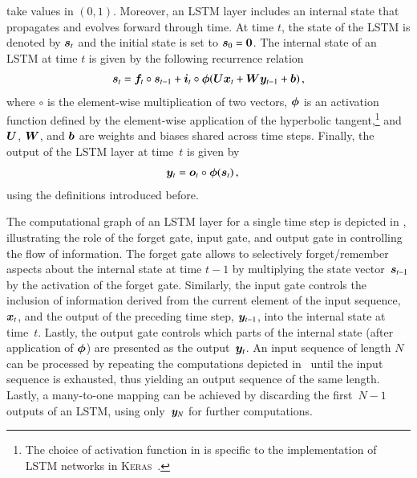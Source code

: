 take values in $(0, 1)$. Moreover, an LSTM layer includes an internal state that
propagates and evolves forward through time. At time $t$, the state of the LSTM
is denoted by $\bm{s}_{t}$ and the initial state is set to
$\bm{s}_{0} = \bm{0}$. The internal state of an LSTM at time $t$ is given
by the following recurrence relation~\cite{Goodfellow-et-al-2016,keras}
\begin{align}
  \bm{s}_{t} = \bm{f}_{t} \circ \bm{s}_{t - 1}
  + \bm{i}_{t} \circ \bm{\phi}(\bm{U} \bm{x}_{t} + \bm{W} \bm{y}_{t-1} + \bm{b}) \,\text{,}
  \label{eq:lstm_state_update}
\end{align}
where $\circ$ is the element-wise multiplication of two vectors, $\bm{\phi}$
is an activation function defined by the element-wise application of the
hyperbolic tangent,\footnote{The choice of activation function in
   is specific to the implementation of LSTM networks
  in \textsc{Keras}~\cite{keras}.} and $\bm{U}$, $\bm{W}$, and $\bm{b}$
are weights and biases shared across time steps. Finally, the output of the LSTM
layer at time~$t$ is given by~\cite{Goodfellow-et-al-2016}
\begin{align}
  &\bm{y}_{t} = \bm{o}_{t} \circ \bm{\phi}(\bm{s}_{t}) \,\text{,}
  \label{eq:lstm_output}
\end{align}
using the definitions introduced before.

The computational graph of an LSTM layer for a single time step is depicted in
, illustrating the role of the forget gate, input gate, and
output gate in controlling the flow of information. The forget gate allows to
selectively forget/remember aspects about the internal state at time $t - 1$ by
multiplying the state vector~$\bm{s}_{t - 1}$ by the activation of the forget
gate. Similarly, the input gate controls the inclusion of information derived
from the current element of the input sequence, $\bm{x}_{t}$, and the output
of the preceding time step, $\bm{y}_{t - 1}$, into the internal state at
time~$t$. Lastly, the output gate controls which parts of the internal state
(after application of $\bm{\phi}$) are presented as the
output~$\bm{y}_{t}$. An input sequence of length $N$ can be processed by
repeating the computations depicted in~ until the input sequence
is exhausted, thus yielding an output sequence of the same length. Lastly, a
many-to-one mapping can be achieved by discarding the first~$N - 1$ outputs of
an LSTM, using only~$\bm{y}_{N}$ for further computations.

